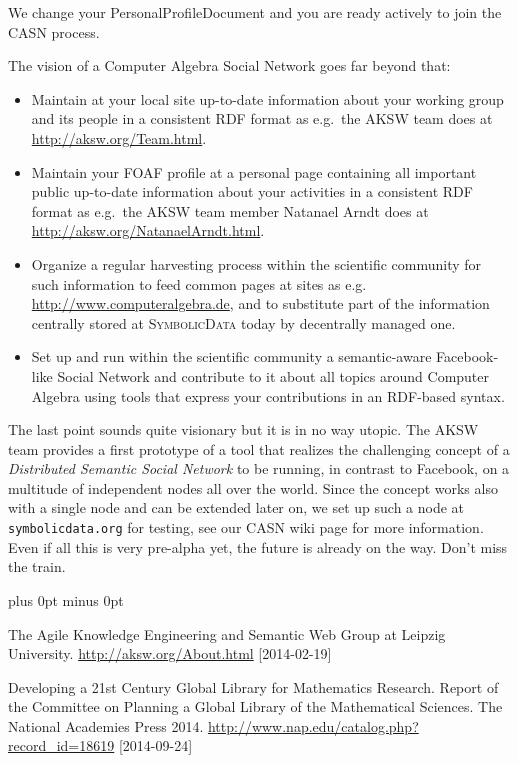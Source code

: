 \documentclass[a4paper,11pt]{article}
\def\SD{\textsc{SymbolicData}}
\def\eg{e.g.\ }
\begin{document}
\begin{multicols}{2}
\begin{itemize}
  We change your PersonalProfileDocument and you are ready actively to
  join the CASN process.
\end{itemize}
The vision of a Computer Algebra Social Network goes far beyond that: 
\begin{itemize}
\item Maintain at your local site up-to-date information about your working
  group and its people in a consistent RDF format as \eg the AKSW team
  \cite{AKSW} does at \url{http://aksw.org/Team.html}.
\item Maintain your FOAF profile at a personal page containing all important
  public up-to-date information about your activities in a consistent RDF
  format as \eg the AKSW team member Natanael Arndt does at
  \url{http://aksw.org/NatanaelArndt.html}.
\item Organize a regular harvesting process within the scientific community for
  such information to feed common pages at sites as \eg
  \url{http://www.computeralgebra.de}, and to substitute part of the
  information centrally stored at {\SD} today by decentrally managed one.
\item Set up and run within the scientific community a semantic-aware
  Facebook-like Social Network and contribute to it about all topics around
  Computer Algebra using tools that express your contributions in an RDF-based
  syntax.
\end{itemize}
The last point sounds quite visionary but it is in no way utopic.  The
AKSW team provides a first prototype of a tool that realizes the
challenging concept of a \emph{Distributed Semantic Social Network}
\cite{dssn} to be running, in contrast to Facebook, on a multitude of
independent nodes all over the world.  Since the concept works also
with a single node and can be extended later on, we set up such a node
at \texttt{symbolicdata.org} for testing, see our CASN wiki page
\cite{sdwiki} for more information.  Even if all this is very
pre-alpha yet, the future is already on the way.  Don't miss the
train.


\begin{thebibliography}{1}
\itemsep=0cm plus 0pt minus 0pt

 The Agile Knowledge Engineering and Semantic Web Group
  at Leipzig University.  \url{http://aksw.org/About.html}
  [2014-02-19]

 Developing a 21st Century Global Library for
  Mathematics Research.  Report of the Committee on Planning a Global
  Library of the Mathematical Sciences.  The National Academies Press
  2014.  \url{http://www.nap.edu/catalog.php?record_id=18619}
  [2014-09-24]


\end{thebibliography}
\end{multicols}
\end{document}
